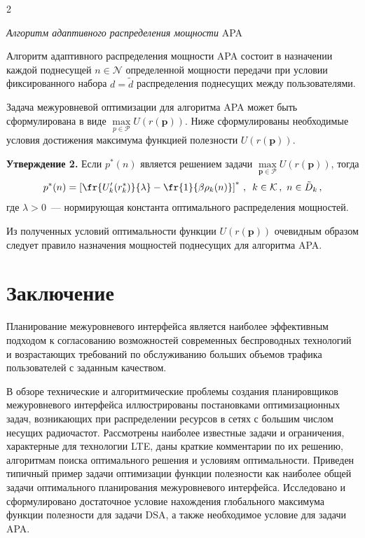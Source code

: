 \begin{multicols}{2}
\medskip

\noindent
\textit{Алгоритм адаптивного распределения мощности} APA

\smallskip

     Алгоритм адаптивного распределения мощ\-ности APA состоит в назначении 
каждой поднесущей $n\in \mathcal{N}$ определенной мощности передачи при условии 
фиксированного набора $d=\tilde{d}$ распределения поднесущих между пользователями.
     
  Задача межуровневой оптимизации для алгоритма APA может быть сформулирована 
в виде $\max\limits_{p\in \mathcal{P}} U(r(\mathbf{p}))$. Ниже сформулированы 
необходимые условия достижения максимума функцией полезности $U(r(\mathbf{p}))$.
  
  \medskip
  
  \noindent
\textbf{Утверждение 2.} Если $p^*(n)$  является решением задачи 
$\max\limits_{\mathbf{p}\in \mathcal{P}} U(r(\mathbf{p}))$, тогда
$$
p^*(n)=\left[ \fr{U^\prime_k(r^*_k)}{\lambda}-\fr{1}{\beta \rho_k(n)}\right]^*\,,\enskip k\in 
\mathcal{K}\,,\ n\in \tilde{D}_k\,,
$$
где $\lambda>0$~--- нормирующая константа оптимального распределения мощностей.
     
     Из полученных условий оптимальности функции $U(r(\mathbf{p}))$ очевидным 
образом следует правило назначения мощностей поднесущих для алгоритма APA.

\section{Заключение}
  
  Планирование межуровневого интерфейса является наиболее эффективным подходом к 
согласованию возможностей современных беспроводных технологий и возрастающих 
требований по обслуживанию больших объемов трафика пользователей с заданным 
качеством. 
  
  В обзоре технические и алгоритмические проблемы создания планировщиков 
межуровневого интерфейса иллюстрированы постановками оптимизационных задач, 
возникающих при распределении ресурсов в сетях с большим числом несущих 
радиочастот. Рассмотрены наиболее известные задачи и ограничения, характерные для 
технологии LTE, даны краткие комментарии по их решению, алгоритмам поиска 
оптимального решения и условиям оптимальности. Приведен типичный пример задачи 
оптимизации функции полезности как наиболее общей задачи оптимального 
планирования межуровневого интерфейса. Исследовано и сформулировано достаточное 
условие нахождения глобального максимума функции полезности для задачи DSA, а 
также необходимое условие для задачи APA.


\end{multicols}
